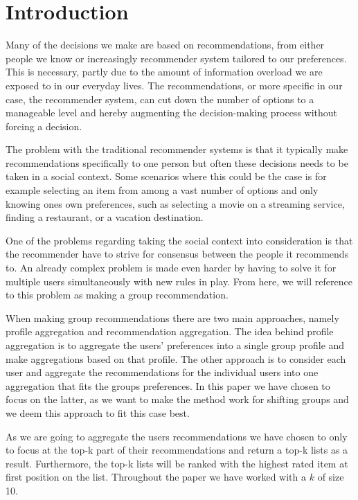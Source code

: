 \section{Introduction}
Many of the decisions we make are based on recommendations, from either people we know or increasingly recommender system tailored to our preferences. This is necessary, partly due to the amount of information overload we are exposed to in our everyday lives. The recommendations, or more specific in our case, the recommender system, can cut down the number of options to a manageable level and hereby augmenting the decision-making process without forcing a decision.

The problem with the traditional recommender systems is that it typically make recommendations specifically to one person but often these decisions needs to be taken in a social context. Some scenarios where this could be the case is for example selecting an item from among a vast number of options and only knowing ones own preferences, such as selecting a movie on a streaming service, finding a restaurant, or a vacation destination.

One of the problems regarding taking the social context into consideration is that the recommender have to strive for consensus between the people it recommends to. An already complex problem is made even harder by having to solve it for multiple users simultaneously with new rules in play. From here, we will reference to this problem as making a group recommendation.

When making group recommendations there are two main approaches, namely profile aggregation and recommendation aggregation. The idea behind profile aggregation is to aggregate the users' preferences into a single group profile and make aggregations based on that profile. The other approach is to consider each user and aggregate the recommendations for the individual users into one aggregation that fits the groups preferences. In this paper we have chosen to focus on the latter, as we want to make the method work for shifting groups and we deem this approach to fit this case best. 

As we are going to aggregate the users recommendations we have chosen to only to focus at the top-k part of their recommendations and return a top-k lists as a result. Furthermore, the top-k lists will be ranked with the highest rated item at first position on the list. Throughout the paper we have worked with a $k$ of size 10.

